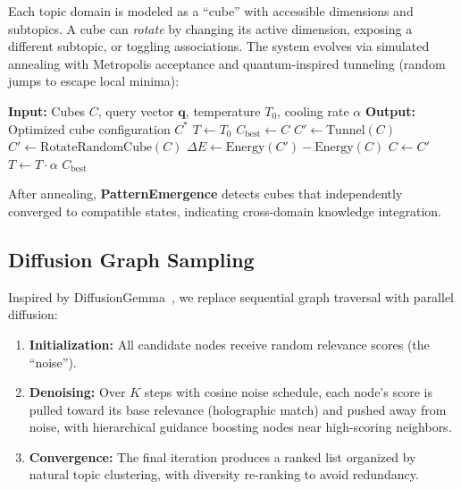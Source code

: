 \documentclass[11pt,a4paper]{article}
\begin{document}
Each topic domain is modeled as a ``cube'' with accessible dimensions and subtopics. A cube can \textit{rotate} by changing its active dimension, exposing a different subtopic, or toggling associations. The system evolves via simulated annealing with Metropolis acceptance and quantum-inspired tunneling (random jumps to escape local minima):

\begin{algorithm}[H]
\caption{Topology Annealing}
\begin{algorithmic}[1]
\State \textbf{Input:} Cubes $C$, query vector $\mathbf{q}$, temperature $T_0$, cooling rate $\alpha$
\State \textbf{Output:} Optimized cube configuration $C^*$
\State $T \gets T_0$
\State $C_{\text{best}} \gets C$
            \State $C' \gets \text{Tunnel}(C)$ 
        \Else
            \State $C' \gets \text{RotateRandomCube}(C)$
        \EndIf
        \State $\Delta E \gets \text{Energy}(C') - \text{Energy}(C)$
            \State $C \gets C'$
        \EndIf
    \EndFor
    \State $T \gets T \cdot \alpha$
\EndWhile
\State \Return $C_{\text{best}}$
\end{algorithmic}
\end{algorithm}

After annealing, \textbf{PatternEmergence} detects cubes that independently converged to compatible states, indicating cross-domain knowledge integration.

\subsection{Diffusion Graph Sampling}

Inspired by DiffusionGemma~\cite{diffusiongemma2026}, we replace sequential graph traversal with parallel diffusion:

\begin{enumerate}[leftmargin=*,itemsep=0pt]
    \item \textbf{Initialization:} All candidate nodes receive random relevance scores (the ``noise'').
    \item \textbf{Denoising:} Over $K$ steps with cosine noise schedule, each node's score is pulled toward its base relevance (holographic match) and pushed away from noise, with hierarchical guidance boosting nodes near high-scoring neighbors.
    \item \textbf{Convergence:} The final iteration produces a ranked list organized by natural topic clustering, with diversity re-ranking to avoid redundancy.
\end{enumerate}
\end{document}
